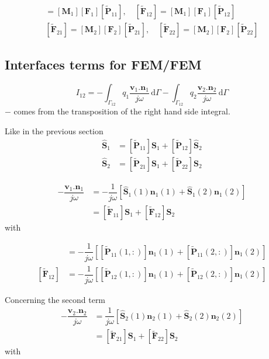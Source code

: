 \documentclass[11pt,A4paper]{book}
\newcommand{\ds}{\displaystyle}
\newcommand{\tb}{\textbf}
\newcommand{\pt}{\textbf{.}}
\newcommand{\esp}{, \quad}
\newcommand{\wdt}[1]{\widetilde{#1}}
\renewcommand{\d}{\,\textrm{d}}
\renewcommand{\:}{\tb{:}}
\begin{document}
\begin{align}
[\wdt{\tb{F}}_{11}]=[\tb{M}_1] [\tb{F}_1] 
[\wdt{\tb{P}}_{11}] \esp [\wdt{\tb{F}}_{12}]=[\tb{M}_1] [\tb{F}_1] 
[\wdt{\tb{P}}_{12}]\\
[\wdt{\tb{F}}_{21}]=[\tb{M}_2] [\tb{F}_2] 
[\wdt{\tb{P}}_{21}] \esp [\wdt{\tb{F}}_{22}]=[\tb{M}_2] [\tb{F}_2] 
[\wdt{\tb{P}}_{22}]
\end{align}


\subsection{Interfaces terms for FEM/FEM}


\begin{equation}
I_{12}=
-\ds{\int_{\Gamma_{12}}} 
q_1 \dfrac{\tb{v}_1\pt\tb{n}_1}{j\omega}
 \d\Gamma -
\ds{\int_{\Gamma_{12}}} 
q_2 \dfrac{\tb{v}_2\pt\tb{n}_2}{j\omega} 
\d\Gamma 
\end{equation}
$-$ comes from the transposition of the right hand side integral. 

Like in the previous section
\begin{align}
	\hat{\tb{S}}_1&=[\wdt{\tb{P}}_{11}]\tb{S}_1+[\wdt{\tb{P}}_{12}]\hat{\tb{S}}_2\\
	\hat{\tb{S}}_2&=[\wdt{\tb{P}}_{21}]\tb{S}_1+[\wdt{\tb{P}}_{22}]\tb{S}_2
\end{align}

\begin{align}
	-\dfrac{\tb{v}_1\pt\tb{n}_1}{j\omega}&=-\dfrac{1}{j\omega}
	\left[\hat{\tb{S}}_1(1)\tb{n}_1(1)+\hat{\tb{S}}_1(2)\tb{n}_1(2)\right]\\
	&=[\wdt{\tb{F}}_{11}]\tb{S}_1+[\wdt{\tb{F}}_{12}]\tb{S}_2
\end{align}
with


\begin{align}
 [\wdt{\tb{F}}_{11}]&=-\dfrac{1}{j\omega}
	\left[[\wdt{\tb{P}}_{11}(1,:)]\tb{n}_1(1)+[\wdt{\tb{P}}_{11}(2,:)]\tb{n}_1(2)\right]\\
	[\wdt{\tb{F}}_{12}]&=-\dfrac{1}{j\omega}
	\left[[\wdt{\tb{P}}_{12}(1,:)]\tb{n}_1(1)+[\wdt{\tb{P}}_{12}(2,:)]\tb{n}_1(2)\right]
\end{align}

Concerning the second term
\begin{align}
	-\dfrac{\tb{v}_2\pt\tb{n}_2}{j\omega}&=\dfrac{1}{j\omega}
	\left[\hat{\tb{S}}_2(1)\tb{n}_2(1)+\hat{\tb{S}}_2(2)\tb{n}_2(2)\right]\\
	&=[\wdt{\tb{F}}_{21}]\tb{S}_1+[\wdt{\tb{F}}_{22}]\tb{S}_2
\end{align}
with
\end{document}

